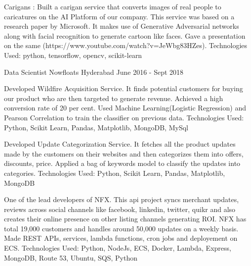 \begin{cventries}
{\begin{cvitems}
        \item{Carigans : Built a carigan service that converts images of real people to caricatures on the AI Platform of our company. This service was based on a research paper by Microsoft. It makes use of Generative Adversarial networks along with facial recognition to generate cartoon like faces. Gave a presentation on the same (https://www.youtube.com/watch?v=JeWbg83HZes). Technologies Used: python, tensorflow, opencv, scikit-learn}     
	\end{cvitems}
    }

  \cventry
    {Data Scientist} %
    {Nowfloats} %
    {Hyderabad} %
    {June 2016 - Sept 2018} %
    {
      \begin{cvitems} %
        \item {Developed Wildfire Acquisition Service. It finds potential customers for buying our product who are then targeted to generate revenue. Achieved a high conversion rate of 20 per cent. Used Machine Learning(Logistic Regression) and Pearson Correlation to train the classifier on previous data. Technologies Used: Python, Scikit Learn, Pandas, Matplotlib, MongoDB, MySql  }
        \item {Developed Update Categorization Service. It fetches all the product updates made by the customers on their websites and then categorizes them into offers, discounts, price. Applied a bag of keywords model to classify the updates into categories. Technologies Used: Python, Scikit Learn, Pandas, Matplotlib, MongoDB  }
        \item {One of the lead developers of NFX. This api project syncs merchant updates, reviews across social channels like facebook, linkedin, twitter, quikr and also creates their online presence on other listing channels generating ROI. NFX has total 19,000 customers and handles around 50,000 updates on a weekly basis. Made REST APIs, services, lambda functions, cron jobs and deployement on ECS. Technologies Used: Python, NodeJs, ECS, Docker, Lambda, Express, MongoDB, Route 53, Ubuntu, SQS, Python}
      \end{cvitems}
    }

\end{cventries}
